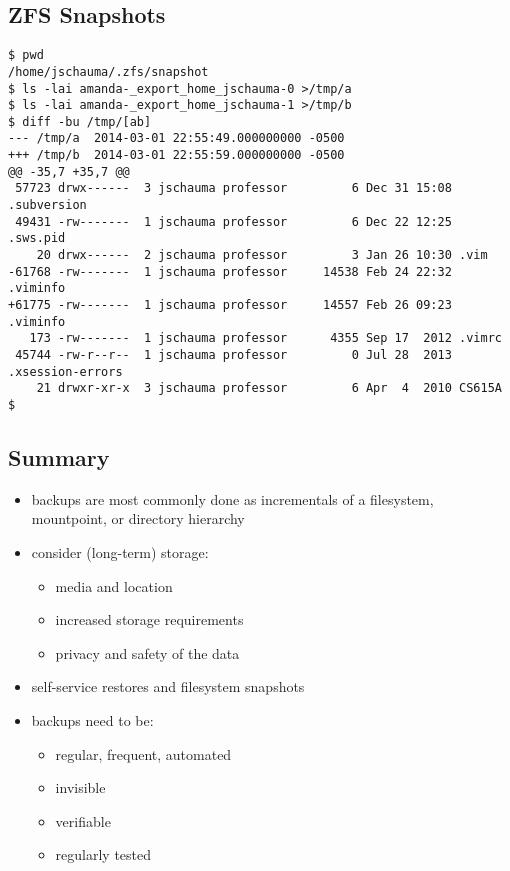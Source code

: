 \documentclass[xga]{xdvislides}
\begin{document}
\subsection{ZFS Snapshots}
\smallish
\begin{verbatim}
$ pwd
/home/jschauma/.zfs/snapshot
$ ls -lai amanda-_export_home_jschauma-0 >/tmp/a
$ ls -lai amanda-_export_home_jschauma-1 >/tmp/b
$ diff -bu /tmp/[ab]
--- /tmp/a	2014-03-01 22:55:49.000000000 -0500
+++ /tmp/b	2014-03-01 22:55:59.000000000 -0500
@@ -35,7 +35,7 @@
 57723 drwx------  3 jschauma professor         6 Dec 31 15:08 .subversion
 49431 -rw-------  1 jschauma professor         6 Dec 22 12:25 .sws.pid
    20 drwx------  2 jschauma professor         3 Jan 26 10:30 .vim
-61768 -rw-------  1 jschauma professor     14538 Feb 24 22:32 .viminfo
+61775 -rw-------  1 jschauma professor     14557 Feb 26 09:23 .viminfo
   173 -rw-------  1 jschauma professor      4355 Sep 17  2012 .vimrc
 45744 -rw-r--r--  1 jschauma professor         0 Jul 28  2013 .xsession-errors
    21 drwxr-xr-x  3 jschauma professor         6 Apr  4  2010 CS615A
$
\end{verbatim}
\Normalsize

\subsection{Summary}
\begin{itemize}
	\item backups are most commonly done as incrementals
		of a filesystem, mountpoint, or directory hierarchy
	\item consider (long-term) storage:
		\begin{itemize}
			\item media and location
			\item increased storage requirements
			\item privacy and safety of the data
		\end{itemize}
	\item self-service restores and filesystem snapshots
	\item backups need to be:
		\begin{itemize}
			\item regular, frequent, automated
			\item invisible
			\item verifiable
			\item regularly tested
		\end{itemize}
\end{itemize}
\end{document}
